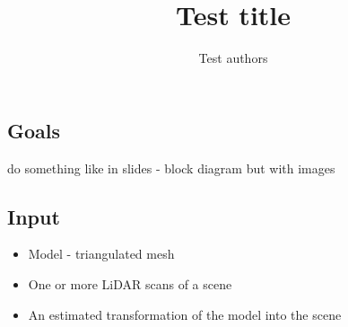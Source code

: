 \documentclass{sciposter}
\title{Test title}
\author{Test authors}
\institute{Test institute}
\begin{document}
\maketitle

\begin{multicols}{5}

\section{Goals}
do something like in slides - block diagram but with images
\subsection{Input}
\begin{itemize}
	\item Model - triangulated mesh
	\item One or more LiDAR scans of a scene
	\item An estimated transformation of the model into the scene
\end{itemize}


\end{multicols}
\end{document}
